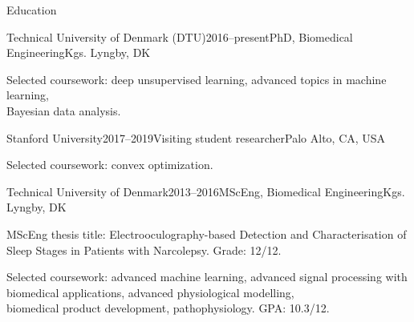 \documentclass{resume} %
\begin{document}
\clearpage
\begin{rSection}{Education}
	
	
	\begin{rSubsection}{Technical University of Denmark (DTU)}{2016--present}{PhD, Biomedical Engineering}{Kgs. Lyngby, DK}
		\item Selected coursework: deep unsupervised learning, advanced topics in machine learning,\\Bayesian data analysis.
	\end{rSubsection}
	
	\begin{rSubsection}{Stanford University}{2017--2019}{Visiting student researcher}{Palo Alto, CA, USA}
		\item Selected coursework: convex optimization.
	\end{rSubsection}
	
	\begin{rSubsection}{Technical University of Denmark}{2013--2016}{MScEng, Biomedical Engineering}{Kgs. Lyngby, DK}
	    \item MScEng thesis title: Electrooculography-based Detection and Characterisation of\\Sleep Stages in Patients with Narcolepsy. Grade: 12/12.
		\item Selected coursework: advanced machine learning, advanced signal processing with \\biomedical applications, advanced physiological modelling,\\ biomedical product development, pathophysiology. GPA: 10.3/12.
	\end{rSubsection}
	

\end{rSection}
\end{document}
